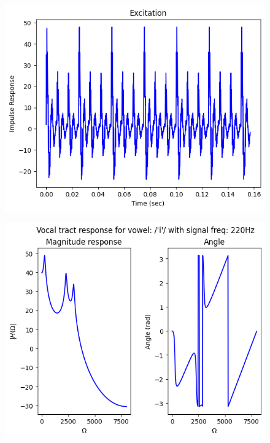 \documentclass{article}
\begin{document}
\begin{figure}[H]
\begin{center}
\includegraphics[scale = 0.5]{Q4_B1R.png}
\end{center}
\end{figure}


\begin{figure}[H]
\begin{center}
\includegraphics[scale = 0.5]{Q4_B2.png}
\end{center}
\end{figure}
\end{document}
